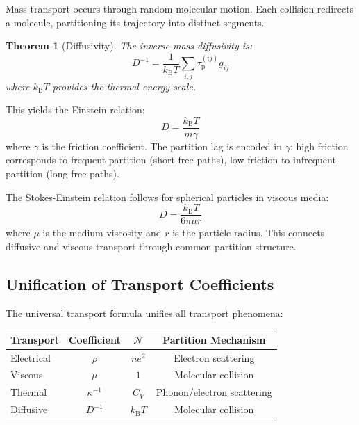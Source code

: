 \documentclass[twocolumn,10pt,aps,prd,superscriptaddress,nofootinbib]{revtex4-2}
\newtheorem{theorem}{Theorem}[section]
\theoremstyle{remark}
\newcommand{\kB}{k_{\mathrm{B}}}
\newcommand{\tauP}{\tau_{\mathrm{p}}}
\newcommand{\Gij}{g_{ij}}
\newcommand{\Norm}{\mathcal{N}}
\begin{document}
Mass transport occurs through random molecular motion. Each collision redirects a molecule, partitioning its trajectory into distinct segments.

\begin{theorem}[Diffusivity]
\label{thm:diffusivity}
The inverse mass diffusivity is:
\begin{equation}
D^{-1} = \frac{1}{\kB T} \sum_{i,j} \tauP^{(ij)} \Gij
\label{eq:diffusivity}
\end{equation}
where $\kB T$ provides the thermal energy scale.
\end{theorem}

This yields the Einstein relation:
\begin{equation}
D = \frac{\kB T}{m \gamma}
\label{eq:einstein_relation}
\end{equation}
where $\gamma$ is the friction coefficient. The partition lag is encoded in $\gamma$: high friction corresponds to frequent partition (short free paths), low friction to infrequent partition (long free paths).

The Stokes-Einstein relation follows for spherical particles in viscous media:
\begin{equation}
D = \frac{\kB T}{6\pi\mu r}
\label{eq:stokes_einstein}
\end{equation}
where $\mu$ is the medium viscosity and $r$ is the particle radius. This connects diffusive and viscous transport through common partition structure.

\subsection{Unification of Transport Coefficients}

The universal transport formula unifies all transport phenomena:

\begin{center}
\begin{tabular}{lccc}
\toprule
Transport & Coefficient & $\Norm$ & Partition Mechanism \\
\midrule
Electrical & $\rho$ & $ne^2$ & Electron scattering \\
Viscous & $\mu$ & $1$ & Molecular collision \\
Thermal & $\kappa^{-1}$ & $C_V$ & Phonon/electron scattering \\
Diffusive & $D^{-1}$ & $\kB T$ & Molecular collision \\
\bottomrule
\end{tabular}
\end{center}
\end{document}
